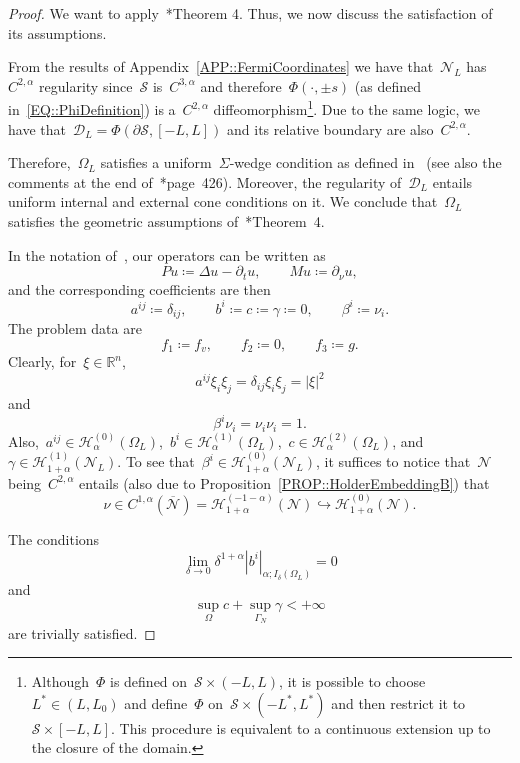 \documentclass[12pt,a4paper]{amsart}
\numberwithin{equation}{section}
\theoremstyle{definition}
\theoremstyle{remark}
\newcommand{\R}{\mathbb{R}}
\newcommand{\abs}[1]{\left\lvert#1\right\rvert}
\begin{document}
\begin{proof}
    We want to apply~\cite{MR826642}*{Theorem 4}. Thus, we now discuss the satisfaction of its assumptions.
    
    From the results of Appendix~\ref{APP::FermiCoordinates} we have that~$\mathcal{N}_L$ has~$C^{2,\alpha}$ regularity since~$\mathcal{S}$ is~$C^{3,\alpha}$ and therefore~$\Phi(\cdot, \pm s)$ (as defined in~\eqref{EQ::PhiDefinition}) is a~$C^{2,\alpha}$ diffeomorphism\footnote{Although~$\Phi$ is defined on~$\mathcal{S} \times (-L,L)$, it is possible to choose~$L^\ast \in (L,L_0)$ and define~$\Phi$ on~$\mathcal{S} \times (-L^\ast,L^\ast)$ and then restrict it to~$\mathcal{S} \times [-L,L]$. This procedure is equivalent to a continuous extension up to the closure of the domain.}. Due to the same logic, we have that~$\mathcal{D}_L = \Phi(\partial \mathcal{S}, [-L, L])$ and its relative boundary are also~$C^{2,\alpha}$.
    
    Therefore,~$\Omega_L$ satisfies a uniform~$\Sigma$-wedge condition as defined in~\cite{MR826642} (see also the comments at the end of~\cite{MR826642}*{page~426}). Moreover, the regularity of~$\mathcal{D}_L$ entails uniform internal and external cone conditions on it. We conclude that~$\Omega_L$ satisfies the geometric assumptions of~\cite{MR826642}*{Theorem~4}.

    In the notation of~\cite{MR826642}, our operators can be written as
    \[Pu \coloneq \Delta u - \partial_t u, \qquad Mu \coloneq \partial_\nu u,\]
    and the corresponding coefficients are then
    \[a^{ij} \coloneq \delta_{ij}, \qquad b^i \coloneq c \coloneq \gamma \coloneq 0, \qquad \beta^i \coloneq \nu_i.\]
    The problem data are
    \[f_1 \coloneq f_v,\qquad f_2 \coloneq 0,\qquad f_3 \coloneq g.\]
    Clearly, for~$\xi \in \R^n$,
    \[a^{ij} \xi_i \xi_j = \delta_{ij} \xi_i \xi_j = \abs{\xi}^2\]
    and
    \[\beta^i \nu_i = \nu_i\nu_i= 1.\]
    Also,~$a^{ij} \in \mathcal{H}_\alpha^{(0)}(\Omega_L)$,~$b^i \in \mathcal{H}_\alpha^{(1)}(\Omega_L)$,~$c \in \mathcal{H}_\alpha^{(2)}(\Omega_L)$, and~$\gamma\in \mathcal{H}_{1+\alpha}^{(1)}(\mathcal{N}_L)$. To see that~$\beta^i\in \mathcal{H}_{1+\alpha}^{(0)}(\mathcal{N}_L)$, it suffices to notice that~$\mathcal{N}$ being~$C^{2,\alpha}$ entails (also due to Proposition~\ref{PROP::HolderEmbeddingB}) that
    \[\nu \in C^{1,\alpha}(\overline{\mathcal{N}}) = \mathcal{H}_{1+\alpha}^{(-1-\alpha)}(\mathcal{N}) \hookrightarrow \mathcal{H}_{1+\alpha}^{(0)}(\mathcal{N}).\]

    The conditions
    \[\lim_{\delta\to 0}\delta^{1+\alpha} \abs{b^i}_{\alpha; I_\delta(\Omega_L)} =0\]
    and
    \[\sup_\Omega c+ \sup_{\Gamma_N} \gamma < +\infty\]
    are trivially satisfied.


\end{proof}
\end{document}

